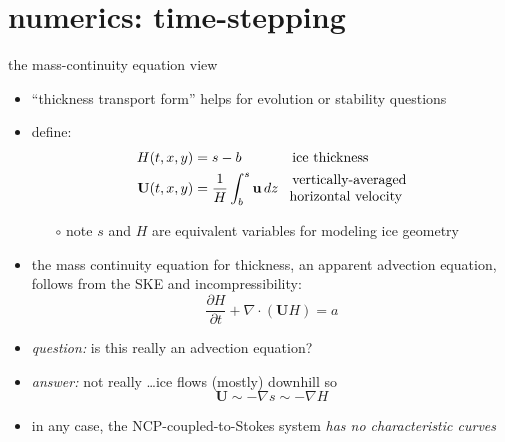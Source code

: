 \documentclass[svgnames,
               hyperref={colorlinks,citecolor=DeepPink4,linkcolor=FireBrick,urlcolor=Maroon},
               usepdftitle=false]  %
               {beamer}
\newcommand{\grad}{\nabla}
\newcommand{\bu}{\mathbf{u}}
\newcommand{\bU}{\mathbf{U}}
\begin{document}
\section{numerics: time-stepping}

\begin{frame}{the mass-continuity equation view}

\begin{itemize}
\item ``thickness transport form'' helps for evolution or stability questions
\item define:
\begin{align*}
H(t,x,y) &=s-b && \text{ice thickness} \\
\bU(t,x,y) &= \frac{1}{H} \int_b^s \bu \,dz && \begin{matrix} \text{vertically-averaged} \\ \hspace{-1.8mm} \text{horizontal velocity} \end{matrix}
\end{align*}

    \begin{itemize}
    \item[$\circ$] note $s$ and $H$ are equivalent variables for modeling ice geometry
    \end{itemize}
\item the \alert{mass continuity equation} for thickness, an apparent \alert{advection equation}, follows from the SKE and incompressibility:
   $$\frac{\partial H}{\partial t} + \nabla \cdot \left(\bU H\right) = a$$

\smallskip
\item<2> \emph{question:} is this really an advection equation?
\item<2>[] \emph{answer:} not really \dots ice flows (mostly) downhill so
  $$\bU \sim - \grad s \sim - \grad H$$
\item<2> in any case, the NCP-coupled-to-Stokes system \emph{has no characteristic curves}
\end{itemize}
\end{frame}
\end{document}
